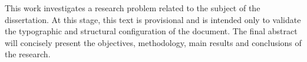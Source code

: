 This work investigates a research problem related to the subject of the
dissertation. At this stage, this text is provisional and is intended only
to validate the typographic and structural configuration of the document.
The final abstract will concisely present the objectives, methodology,
main results and conclusions of the research.

